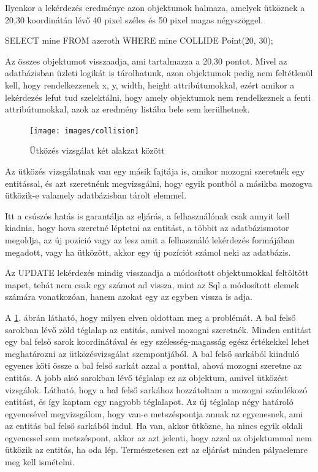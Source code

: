 \begin{sql}
Ilyenkor a lekérdezés eredménye azon objektumok halmaza, amelyek ütköznek a 20,30 koordinátán lévő 40 pixel széles és 50 pixel magas négyszöggel.

\begin{sql}
SELECT mine
FROM azeroth
WHERE mine COLLIDE Point(20, 30);
\end{sql}

Az összes objektumot visszaadja, ami tartalmazza a 20,30 pontot. 
Mivel az adatbázisban üzleti logikát is tárolhatunk, azon objektumok pedig nem feltétlenül kell, hogy rendelkezzenek x, y, width, height attribútumokkal, ezért amikor a lekérdezés lefut tud szelektálni, hogy amely objektumok nem rendelkeznek a fenti attribútumokkal, azok az eredmény listába bele sem kerülhetnek.

\begin{figure}[htb]
\begin{center}
    \texttt{[image: images/collision]}
    \caption{Ütközés vizsgálat két alakzat között}
    \label{fig:collision}
\end{center}
\end{figure}

Az ütközés vizsgálatnak van egy másik fajtája is, amikor mozogni szeretnék egy entitással, és azt szeretnénk megvizsgálni, hogy egyik pontból a másikba mozogva ütközik-e valamely adatbázisban tárolt elemmel.

Itt a csúszós hatás is garantálja az eljárás, a felhasználónak csak annyit kell kiadnia, hogy hova szeretné léptetni az entitást, a többit az adatbázismotor megoldja, az új pozíció vagy az lesz amit a felhasználó lekérdezés formájában megadott, vagy ha ütközött, akkor egy új pozíciót számol neki az adatbázis.

Az UPDATE lekérdezés mindig visszaadja a módosított objektumokkal feltöltött mapet, tehát nem csak egy számot ad vissza, mint az Sql a módosított elemek számára vonatkozóan, hanem azokat egy az egyben vissza is adja.



A \ref{fig:collision}. ábrán látható, hogy milyen elven oldottam meg a problémát. A bal fels\H o sarokban lév\H o zöld téglalap az entitás, amivel mozogni szeretnék. Minden entitást egy bal fels\H o sarok koordinátával és egy szélesség-magasság egész értékekkel lehet meghatározni az ütközésvizsgálat szempontjából. A bal fels\H o sarkából kiinduló egyenes köti össze a bal fels\H o sarkát azzal a ponttal, ahová mozogni szeretne az entitás. A jobb alsó sarokban lév\H o téglalap ez az objektum, amivel ütközést vizsgálok. Látható, hogy a bal fels\H o sarkához hozzátoltam a mozogni szándékozó entitást, és így kaptam egy nagyobb téglalapot.
Az új téglalap négy határoló egyenesével megvizsgálom, hogy van-e metszéspontja annak az egyenesnek, ami az entitás bal fels\H o sarkából indul. Ha van, akkor ütközne, ha nincs egyik oldali egyenessel sem metszéspont, akkor az azt jelenti, hogy azzal az objektummal nem ütközik az entitás, ha oda lép. Természetesen ezt az eljárást minden pályaelemre meg kell ismételni.




\end{sql}
